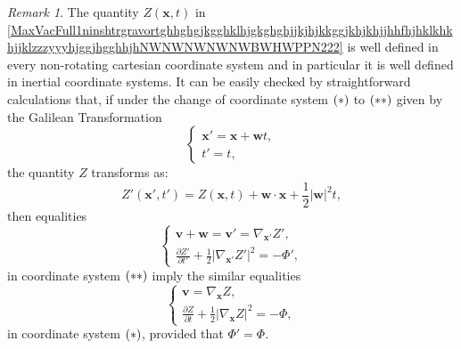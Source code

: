 \documentclass{article}
\theoremstyle{definition}
\theoremstyle{remark}
\newtheorem{remark}{Remark}[section]
\renewcommand{\vec}[1]{\mathbf{#1}}
\newcommand{\er}{\eqref}
\newcommand{\er}{\eqref}
\newtheorem{remark}{Remark}
\begin{document}
\begin{remark}\label{ugyugg}
The quantity $Z(\vec x,t)$ in
\er{MaxVacFull1ninshtrgravortghhghgjkgghklhjgkghghjjkjhjkkggjkhjkhjjhhfhjhklkhkhjjklzzzyyyhjggjhgghhjhNWNWNWNWNWBWHWPPN222}
is well defined in every non-rotating cartesian coordinate system
and in particular it is well defined in inertial coordinate systems.
It can be easily checked by straightforward calculations that, if
under the change of coordinate system $\bf{(*)}$ to $\bf{(**)}$
given by the Galilean Transformation
\begin{equation}\label{noninchgravortbstrjgghguittu1intmm}
\begin{cases}
\vec x'=\vec x+\vec wt,\\
t'=t,
\end{cases}
\end{equation}
the quantity $Z$ transforms as:
\begin{equation}\label{noninchgravortbstrjgghguittu1intmmjhhj}
Z'(\vec x',t')=Z(\vec x,t)+\vec w\cdot\vec x+\frac{1}{2}|\vec w|^2t,
\end{equation}
then equalities
\begin{equation}
\label{MaxVacFull1ninshtrgravortghhghgjkgghklhjgkghghjjkjhjkkggjkhjkhjjhhfhjhklkhkhjjklzzzyyyhjggjhgghhjhNWNWNWNWNWBWHWPPN222kkk}
\begin{cases}
\vec v+\vec w=\vec v'=\nabla_{\vec x'}Z',\\
\frac{\partial Z'}{\partial t'}+\frac{1}{2}\left|\nabla_{\vec
x'}Z'\right|^2=-\Phi',
\end{cases}
\end{equation}
in coordinate system $\bf{(**)}$ imply the similar equalities
\begin{equation}
\label{MaxVacFull1ninshtrgravortghhghgjkgghklhjgkghghjjkjhjkkggjkhjkhjjhhfhjhklkhkhjjklzzzyyyhjggjhgghhjhNWNWNWNWNWBWHWPPN222kkkkjj}
\begin{cases}
\vec v=\nabla_{\vec x}Z,\\
\frac{\partial Z}{\partial t}+\frac{1}{2}\left|\nabla_{\vec
x}Z\right|^2=-\Phi,
\end{cases}
\end{equation}
in coordinate system $\bf{(*)}$, provided that $\Phi'=\Phi$.
\end{remark}
\end{document}
